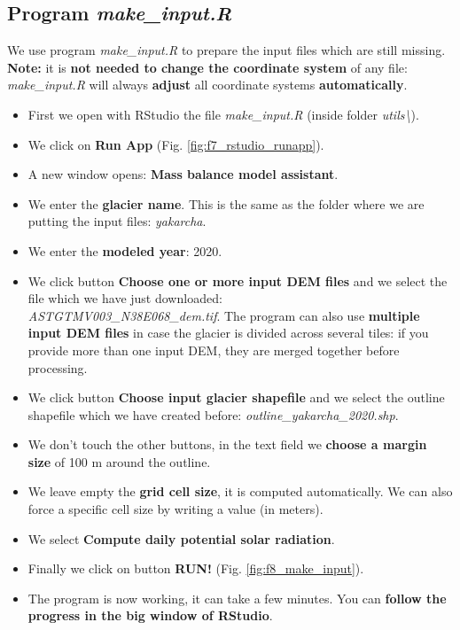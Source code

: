 \documentclass[15pt]{extarticle}
\begin{document}
\subsection{Program \textit{make\_input.R}}
\label{sect:input_make_input}
We use program \textit{make\_input.R} to prepare the input files which are still missing.\\\textbf{Note:} it is \textbf{not needed to change the coordinate system} of any file: \textit{make\_input.R} will always \textbf{adjust} all coordinate systems \textbf{automatically}.
\begin{itemize}
    \item First we open with RStudio the file \textit{make\_input.R} (inside folder \textit{utils\textbackslash}).
    \item We click on \textbf{Run App} (Fig. \ref{fig:f7_rstudio_runapp}).
    \item A new window opens: \textbf{Mass balance model assistant}.
    \item We enter the \textbf{glacier name}. This is the same as the folder where we are putting the input files: \textit{yakarcha}.
    \item We enter the \textbf{modeled year}: 2020.
    \item We click button \textbf{Choose one or more input DEM files} and we select the file which we have just downloaded: \\\textit{ASTGTMV003\_N38E068\_dem.tif}. The program can also use \textbf{multiple input DEM files} in case the glacier is divided across several tiles: if you provide more than one input DEM, they are merged together before processing.
    \item We click button \textbf{Choose input glacier shapefile} and we select the outline shapefile which we have created before: \textit{outline\_yakarcha\_2020.shp}.
    \item We don't touch the other buttons, in the text field we \textbf{choose a margin size} of 100 m around the outline.
    \item We leave empty the \textbf{grid cell size}, it is computed automatically. We can also force a specific cell size by writing a value (in meters).
    \item We select \textbf{Compute daily potential solar radiation}.
    \item Finally we click on button \textbf{RUN!} (Fig. \ref{fig:f8_make_input}).
    \item The program is now working, it can take a few minutes. You can \textbf{follow the progress in the big window of RStudio}.

\end{itemize}
\end{document}
